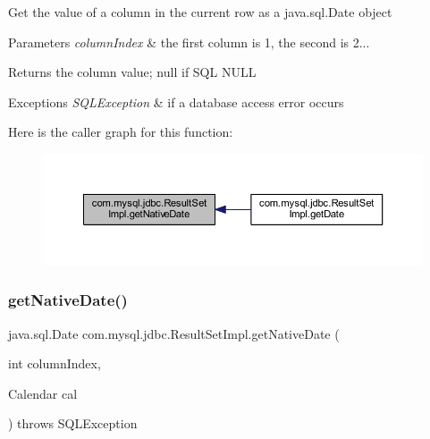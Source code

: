Get the value of a column in the current row as a java.\+sql.\+Date object


\begin{DoxyParams}{Parameters}
{\em column\+Index} & the first column is 1, the second is 2...\\
\hline
\end{DoxyParams}
\begin{DoxyReturn}{Returns}
the column value; null if S\+QL N\+U\+LL
\end{DoxyReturn}

\begin{DoxyExceptions}{Exceptions}
{\em S\+Q\+L\+Exception} & if a database access error occurs \\
\hline
\end{DoxyExceptions}
Here is the caller graph for this function\+:
\nopagebreak
\begin{figure}[H]
\begin{center}
\leavevmode
\includegraphics[width=350pt]{classcom_1_1mysql_1_1jdbc_1_1_result_set_impl_a33bd8cbc2dd3679a2e995584de40d936_icgraph}
\end{center}
\end{figure}
\mbox{\label{classcom_1_1mysql_1_1jdbc_1_1_result_set_impl_a9f5825bb9f83d92ebebe4e1b1faec151}} 
\subsubsection{\texorpdfstring{get\+Native\+Date()}{getNativeDate()}\hspace{0.1cm}{\footnotesize\ttfamily [2/2]}}
{\footnotesize\ttfamily java.\+sql.\+Date com.\+mysql.\+jdbc.\+Result\+Set\+Impl.\+get\+Native\+Date (\begin{DoxyParamCaption}\item[{int}]{column\+Index,  }\item[{Calendar}]{cal }\end{DoxyParamCaption}) throws S\+Q\+L\+Exception\hspace{0.3cm}{\ttfamily [protected]}}

